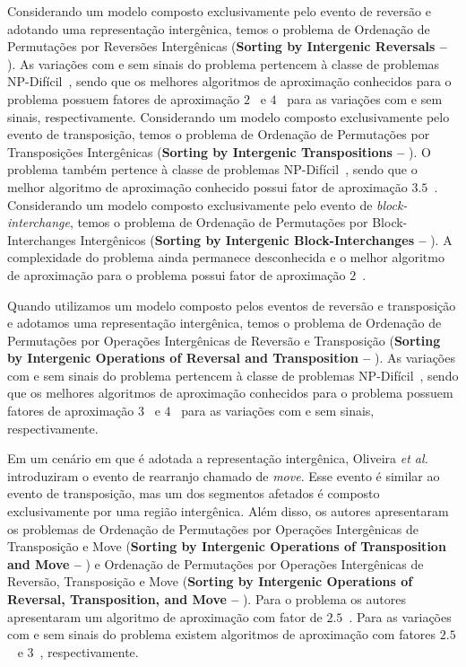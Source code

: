 Considerando um modelo composto exclusivamente pelo evento de reversão e adotando uma representação intergênica, temos o problema de Ordenação de Permutações por Reversões Intergênicas (\textbf{Sorting by Intergenic Reversals --} \SbIR). As variações com e sem sinais do problema pertencem à classe de problemas NP-Difícil~\cite{2021b-oliveira-etal,2020a-brito-etal}, sendo que os melhores algoritmos de aproximação conhecidos para o problema possuem fatores de aproximação $2$~\cite{2021b-oliveira-etal} e $4$~\cite{2020a-brito-etal} para as variações com e sem sinais, respectivamente. Considerando um modelo composto exclusivamente pelo evento de transposição, temos o problema de Ordenação de Permutações por Transposições Intergênicas (\textbf{Sorting by Intergenic Transpositions --} \SbIT). O problema também pertence à classe de problemas NP-Difícil~\cite{2021a-oliveira-etal}, sendo que o melhor algoritmo de aproximação conhecido possui fator de aproximação $3.5$~\cite{2021a-oliveira-etal}. Considerando um modelo composto exclusivamente pelo evento de \emph{block-interchange}, temos o problema de Ordenação de Permutações por Block-Interchanges Intergênicos (\textbf{Sorting by Intergenic Block-Interchanges --} \SbIBI). A complexidade do problema ainda permanece desconhecida e o melhor algoritmo de aproximação para o problema possui fator de aproximação $2$~\cite{2019-dias-etal}.

Quando utilizamos um modelo composto pelos eventos de reversão e transposição e adotamos uma representação intergênica, temos o problema de Ordenação de Permutações por Operações Intergênicas de Reversão e Transposição (\textbf{Sorting by Intergenic Operations of Reversal and Transposition --} \SbIRT). As variações com e sem sinais do problema pertencem à classe de problemas NP-Difícil~\cite{2021a-oliveira-etal,2020a-brito-etal}, sendo que os melhores algoritmos de aproximação conhecidos para o problema possuem fatores de aproximação $3$~\cite{2021a-oliveira-etal} e $4$~\cite{2021b-brito-etal} para as variações com e sem sinais, respectivamente.

Em um cenário em que é adotada a representação intergênica, Oliveira \textit{et al.}~\cite{2021a-oliveira-etal} introduziram o evento de rearranjo chamado de \emph{move}. Esse evento é similar ao evento de transposição, mas um dos segmentos afetados é composto exclusivamente por uma região intergênica. Além disso, os autores apresentaram os problemas de Ordenação de Permutações por Operações Intergênicas de Transposição e Move (\textbf{Sorting by Intergenic Operations of Transposition and Move --} \SbITM) e Ordenação de Permutações por Operações Intergênicas de Reversão, Transposição e Move (\textbf{Sorting by Intergenic Operations of Reversal, Transposition, and Move --} \SbIRTM). Para o problema \SbITM{} os autores apresentaram um algoritmo de aproximação com fator de $2.5$~\cite{2021a-oliveira-etal}. Para as variações com e sem sinais do problema \SbIRTM{} existem algoritmos de aproximação com fatores $2.5$~\cite{2021a-oliveira-etal} e $3$~\cite{2021b-brito-etal}, respectivamente.  


